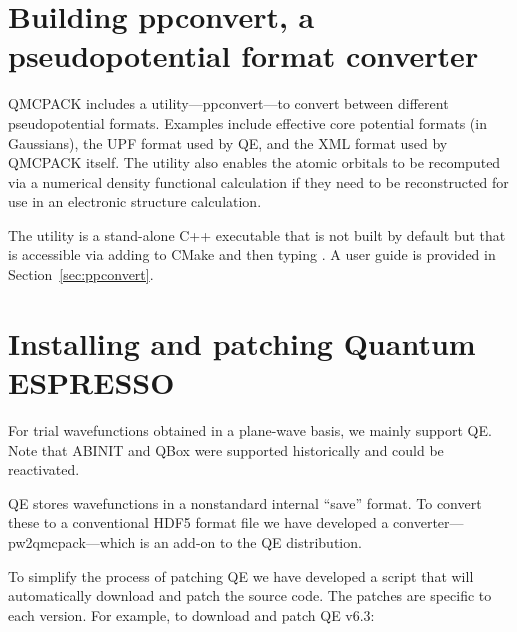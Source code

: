 \section{Building ppconvert, a pseudopotential format converter}
\label{sec:buildppconvert}
QMCPACK includes a utility---ppconvert---to convert between different
pseudopotential formats. Examples include effective core potential
formats (in Gaussians), the UPF format used by QE, and
the XML format used by QMCPACK itself. The utility also enables the
atomic orbitals to be recomputed via a numerical density functional
calculation if they need to be reconstructed for use in an
electronic structure calculation.

The utility is a stand-alone C++ executable that is not built by default but that is accessible via adding
 to CMake and then typing .
A user guide is provided in Section~\ref{sec:ppconvert}.

\section{Installing and patching Quantum ESPRESSO}
\label{sec:buildqe}
For trial wavefunctions obtained in a plane-wave basis, we mainly
support QE. Note that ABINIT and QBox were supported historically
and could be reactivated.

QE stores wavefunctions in a nonstandard internal
``save'' format. To convert these to a conventional HDF5 format file
we have developed a converter---pw2qmcpack---which is an add-on to the
QE distribution.

To simplify the process of patching QE we have developed
a script that will automatically download and patch the source
code. The patches are specific to each version. For example, to download and
patch QE v6.3:

